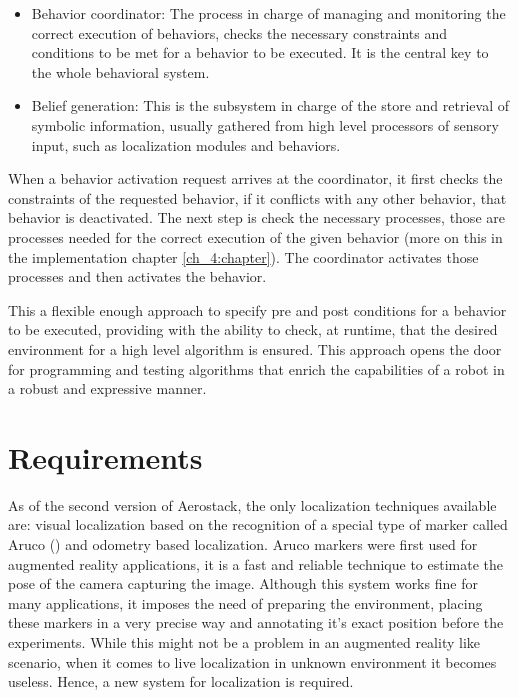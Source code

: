     \begin{itemize}
      \item Behavior coordinator: The process in charge of managing and monitoring the correct execution of behaviors, checks the necessary constraints and conditions to be met for a behavior to be executed. It is the central key to the whole behavioral system.
      \item Belief generation: This is the subsystem in charge of the store and retrieval of symbolic information, usually gathered from high level processors of sensory input, such as localization modules and behaviors.
    \end{itemize}

    When a behavior activation request arrives at the coordinator, it first checks the constraints of the requested behavior, if it conflicts with any other behavior, that behavior is deactivated. The next step is check the necessary processes, those are processes needed for the correct execution of the given behavior (more on this in the implementation chapter \ref{ch_4:chapter}). The coordinator activates those processes and then activates the behavior.

    This a flexible enough approach to specify pre and post conditions for a behavior to be executed, providing with the ability to check, at runtime, that the desired environment for a high level algorithm is ensured. This approach opens the door for programming and testing algorithms that enrich the capabilities of a robot in a robust and expressive manner.

  \section{Requirements} \label{ch_2:sect:requirements}

    As of the second version of Aerostack, the only localization techniques available are: visual localization based on the recognition of a special type of marker called Aruco (\cite{romeroramirez201838}) and odometry based localization. Aruco markers were first used for augmented reality applications, it is a fast and reliable technique to estimate the pose of the camera capturing the image. Although this system works fine for many applications, it imposes the need of preparing the environment, placing these markers in a very precise way and annotating it's exact position before the experiments. While this might not be a problem in an augmented reality like scenario, when it comes to live localization in unknown environment it becomes useless. Hence, a new system for localization is required.

